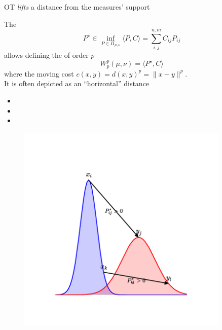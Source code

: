\documentclass[pdf,aspectratio=169,10pt]{beamer}
\begin{document}
\begin{frame}{OT \emph{lifts} a distance from the measures' support}
    \\
    \begin{minipage}{0.59\textwidth}
        The 
        \begin{equation*}
            P^\star \in \inf_{P\in\Pi_{\mu,\nu}} \langle P , C\rangle = \sum_{i,j}^{n,m} C_{ij}P_{ij} 
        \end{equation*}
        allows defining the  of order $p$
        \begin{equation*}
            W^p_p(\mu, \nu) =  \langle P^\star , C\rangle
        \end{equation*}
        where the moving cost $c(x, y) = {d(x, y)}^p = \| x - y \|^p$.\\
        It is often depicted as an ``horizontal'' distance
\begin{itemize}
          \item[\bred{$\checkmark$}] 
          \item[\bred{$\checkmark$}]  
          \item[\bred{$\checkmark$}] 
      \end{itemize}       
    \end{minipage}
    \hfill
    \begin{minipage}{0.4\textwidth}
    \begin{figure}
        \centering
            \includegraphics[trim={2cm 2cm 2cm 2cm},clip, width=0.9\textwidth]{../img/horizontal_distance.pdf}
        \end{figure}
        \centering
        \small
    \end{minipage}
    

\end{frame}
\end{document}
